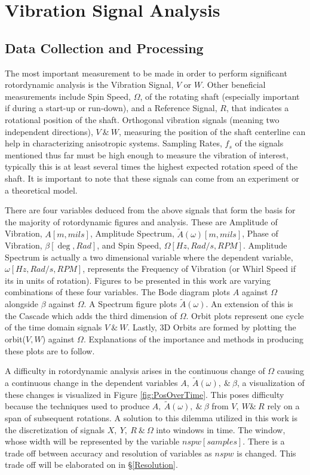 \chapter{Vibration Signal Analysis}
\section{Data Collection and Processing}
The most important measurement to be made in order to perform significant rotordynamic analysis is the Vibration Signal, $ V $ or $ W $. Other beneficial measurements include Spin Speed, $ \Omega $, of the rotating shaft (especially important if during a start-up or run-down), and a Reference Signal, $ R $, that indicates a rotational position of the shaft. Orthogonal vibration signals (meaning two independent directions), $ V\ \&\ W $, measuring the position of the shaft centerline can help in characterizing anisotropic systems. Sampling Rates, $ f_s $ of the signals mentioned thus far must be high enough to measure the vibration of interest, typically this is at least several times the highest expected rotation speed of the shaft. It is important to note that these signals can come from an experiment or a theoretical model.\par
There are four variables deduced from the above signals that form the basis for the majority of rotordynamic figures and analysis. These are Amplitude of Vibration, $ A[m,mils] $, Amplitude Spectrum, $ \tilde{A}(\omega)[m,mils] $, Phase of Vibration, $ \beta[\deg,Rad] $, and Spin Speed, $ \Omega[Hz,Rad/s,RPM] $. Amplitude Spectrum is actually a two dimensional variable where the dependent variable, $ \omega[Hz,Rad/s,RPM] $, represents the Frequency of Vibration (or Whirl Speed if its in units of rotation). Figures to be presented in this work are varying combinations of these four variables. The Bode diagram plots $ A $ against $ \Omega $ alongside $ \beta $  against $ \Omega $. A Spectrum figure plots $ \tilde{A}(\omega) $. An extension of this is the Cascade which adds the third dimension of $ \Omega $. Orbit plots represent one cycle of the time domain signals $ V\ \&\ W $. Lastly, 3D Orbits are formed by plotting the orbit($ V,W $) against $ \Omega $. Explanations of the importance and methods in producing these plots are to follow. \par
A difficulty in rotordynamic analysis arises in the continuous change of $ \Omega $ causing a continuous change in the dependent variables $ A,\ \tilde{A}(\omega),\ \&\ \beta $, a visualization of these changes is visualized in Figure \ref{fig:PosOverTime}. This poses difficulty because the techniques used to produce $ A,\ \tilde{A}(\omega),\ \&\ \beta $ from $ V,\ W\&\ R $ rely on a span of subsequent rotations. A solution to this dilemma utilized in this work is the discretization of signals $ X,\ Y,\ R\ \&\ \Omega $ into windows in time. The window, whose width will be represented by the variable $ nspw[samples] $. There is a trade off between accuracy and resolution of variables as $ nspw $ is changed. This trade off will be elaborated on in \S\ref{Resolution}.\par 
